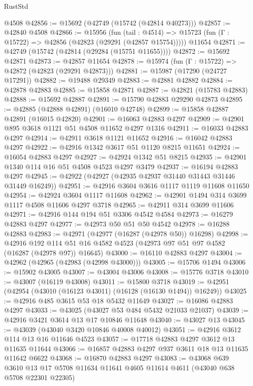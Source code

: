 \begin{lexlean}{RustStd}
\begin{coremodule}
    @4508
@42856 := @15692 (@42749 (@15742 (@42814 @40273)))
@42857 := @42840 @4508
@42866 := @15956
    (fun (tail : @4514) => @15723 (fun (Γ : @15722) => @42856 (@42823 (@29291 (@42857 @15754)))))
    @11654
@42871 := @42749 (@15742 (@42814 (@29284 (@15751 @11655))))
@42872 := @15692 @42871
@42873 := @42857 @11654
@42878 := @15974 (fun (Γ : @15722) => @42872 (@42823 (@29291 @42873)))
@42881 := @15987 (@17290 (@24727 @17291))
@42882 := @19488 @29349
@42883 := @42881 @42882
@42884 := @42878 @42883
@42885 := @15858 @42871
@42887 := @42821 (@15783 @42883)
@42888 := @15692 @42887
@42891 := @15790 @42883 @29290 @42873
@42895 := @42885 (@42888 @42891) (@16010 @42748)
@42899 := @15858 @42887 @42891 (@16015 @42820)
@42901 := @16063 @42883 @4297
@42909 := @42901 @895 @3618 @1121 @51 @4508 @11652 @4297 @1316
@42911 := @16033 @42883 @4297
@42914 := @42911 @3618 @1121 @11652
@42916 := @16042 @42883 @4297
@42922 := @42916 @1342 @3617 @51 @1120 @8215 @11651
@42924 := @16054 @42883 @4297
@42927 := @42924 @1342 @51 @8215
@42935 := @42901 @1340 @114 @16 @51 @4508 @4523 @4297 @3479
@42937 := @16194 @42883 @4297
@42945 := @42922 (@42927 (@42935 @42937 @31440 @31443 @31446 @31449 @16249))
@42951 := @42916 @3604 @3616 @1117 @1119 @11608 @11650
@42954 := @42924 @3604 @1117 @11608
@42962 := @42901 @1494 @314 @3699 @1117 @4508 @11606 @4297 @3718
@42965 := @42911 @314 @3699 @11606
@42971 := @42916 @144 @194 @51 @3306 @4542 @4584
@42973 := @16279 @42883 @4297
@42977 := @42973 @50 @51 @50 @4542
@42978 := @16288 @42883
@42983 := @42971 (@42977 (@16287 (@42978 @50)) @16298)
@42998 := @42916
    @192
    @114
    @51
    @16
    @4582
    @4523
    (@42973 @97 @51 @97 @4582 (@16287 (@42978 @97)) @16645)
@43000 := @16110 @42883 @4297
@43004 := @42962 (@42965 (@42983 (@42998 @43000)))
@43005 := @15706 @1494
@43006 := @15902 @43005
@43007 := @43004 @43006
@43008 := @15776 @3718
@43010 := @43007 (@16119 @43008)
@43011 := @15800 @3718
@43019 := @42951 (@42954 (@43010 (@16123 @43011) (@16128 (@16130 @1494)) @16249))
@43025 := @42916 @485 @3615 @53 @18 @5432 @11649
@43027 := @16086 @42883 @4297
@43033 := @43025 (@43027 @53 @484 @5432 @21033 @21037)
@43039 := @42916 @3421 @3614 @13 @17 @10846 @11648
@43040 := @43027 @13
@43045 := @43039 (@43040 @3420 @10846 @40008 @40012)
@43051 := @42916 @3612 @114 @13 @16 @11646 @4523
@43057 := @17718 @42883 @4297 @3612 @13 @11635 @11644
@43066 := @16857 @42883 @4297 @937 @3611 @18 @13 @11635 @11642 @6622
@43068 := @16870 @42883 @4297
@43083 := @43068
    @639
    @3610
    @13
    @17
    @5708
    @11634
    @11641
    @4605
    @11614
    @4611
    (@43040 @638 @5708 @22301 @22305)

\end{coremodule}
\end{lexlean}
